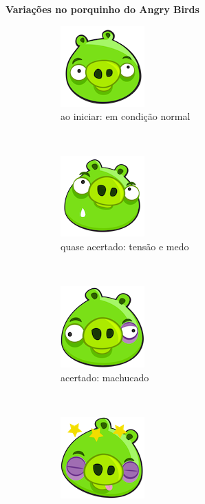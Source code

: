 \expandafter\documentclass\expandafter[table, usenames, svgnames, dvipsnames, \classopts]{beamer}
\begin{document}
\begin{frame}{\textbf{Variações no porquinho do Angry Birds}}

	\begin{figure}
	    \centering

	    \begin{subfigure}[!h]{0.2\paperwidth}
	    	\centering
	    	\includegraphics[height=0.2\paperheight]{angry-birds-pig1}
	        \caption{\scriptsize ao iniciar: em condição normal}
	    \end{subfigure}
	    ~
		\begin{subfigure}[!h]{0.2\paperwidth}
			\centering
	        \includegraphics[height=0.2\paperheight]{angry-birds-pig2}
	        \caption{\scriptsize quase acertado: tensão e medo}
	    \end{subfigure}
	    ~
		\begin{subfigure}[!h]{0.2\paperwidth}
			\centering
	        \includegraphics[height=0.2\paperheight]{angry-birds-pig3}
	        \caption{\scriptsize acertado: machucado}
	    \end{subfigure}
	    \\
		\begin{subfigure}[!h]{0.2\paperwidth}
			\centering
	        \includegraphics[height=0.2\paperheight]{angry-birds-pig4}

\end{subfigure}
\end{figure}
\end{frame}
\end{document}
